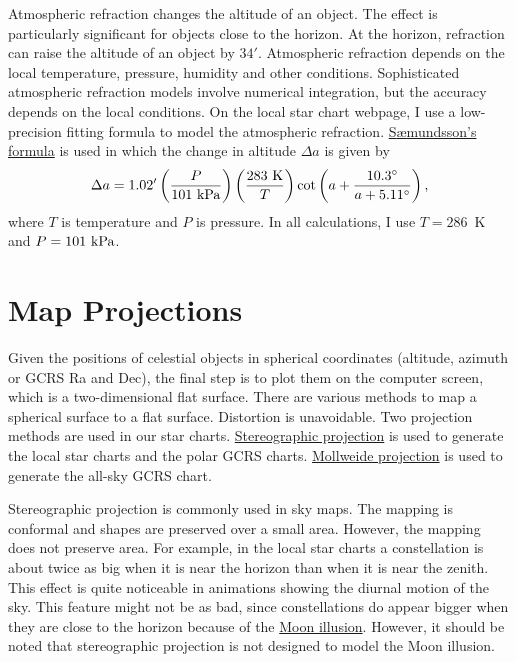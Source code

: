 \documentclass[12pt]{article}
\newcommand \beq {\begin{equation}}
\newcommand \eeq {\end{equation}}
\begin{document}
Atmospheric refraction changes the altitude of an object. The effect is particularly 
significant for objects close to the horizon. At the horizon, refraction 
can raise the altitude of an object by $34'$. Atmospheric refraction 
depends on the local temperature, pressure, humidity and other conditions. 
Sophisticated atmospheric refraction models involve numerical integration, 
but the accuracy depends on the local conditions.
On the local star chart webpage, I use a low-precision fitting formula 
to model the atmospheric refraction. 
\href{https://en.wikipedia.org/wiki/Atmospheric_refraction#cite_note-Saemundsson1986-24}{S{\ae}mundsson's formula} 
is used in which the change in altitude $\Delta a$ is given by 
\beq
  \Delta a = 1.02' \left(\frac{P}{101~{\rm kPa}}\right) 
\left( \frac{283~{\rm K}}{T}\right)  
\cot \left(a + \frac{10.3^\circ}{a + 5.11^\circ}\right) ,
\label{eq:atmRefraction}
\eeq
where $T$ is temperature and $P$ is pressure. In all calculations, 
I use $T=286$~K and $P=101~{\rm kPa}$.

\section{Map Projections}
\label{sec:maps}

Given the positions of celestial objects in spherical coordinates (altitude, 
azimuth or GCRS Ra and Dec), the final step is to plot them on the computer 
screen, which is a two-dimensional flat surface. There are various methods 
to map a spherical surface to a flat surface. Distortion is unavoidable. 
Two projection methods are used in our star charts. 
\href{https://en.wikipedia.org/wiki/Stereographic_projection}{Stereographic projection} 
is used to generate the local star charts and the polar GCRS charts. 
\href{https://en.wikipedia.org/wiki/Mollweide_projection}{Mollweide projection} 
is used to generate the all-sky GCRS chart. 

Stereographic projection is commonly used in sky maps. The mapping is 
conformal and shapes are preserved over a small area. However, 
the mapping does not preserve area. For example, in the local star charts 
a constellation is about twice as big when it is near the horizon than 
when it is near the zenith. This effect is quite noticeable in animations 
showing the diurnal motion of the sky. This feature might not be as bad, 
since constellations do appear bigger when they are close to the horizon 
because of the \href{https://www.skyandtelescope.com/observing/moon-illusion-confusion11252015/}{Moon illusion}. 
However, it should be noted that stereographic projection is not 
designed to model the Moon illusion.
\end{document}
